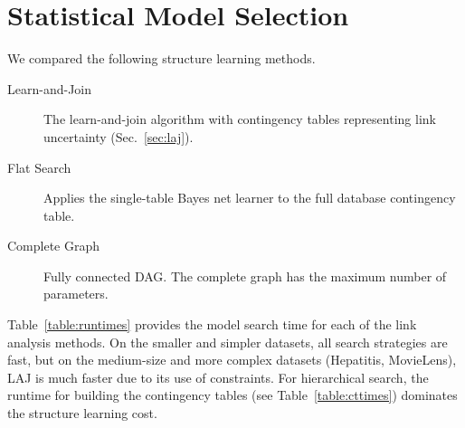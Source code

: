 \documentclass{vldb}
\begin{document}
\section{Statistical Model Selection}


We compared the following structure learning methods.

\begin{description}
\item[Learn-and-Join ] The learn-and-join algorithm with contingency tables representing link uncertainty (Sec.~\ref{sec:laj}).
\item[Flat Search]  Applies the single-table Bayes net learner to the full database contingency table.
\item[Complete Graph] Fully connected DAG. The complete graph has the maximum number of parameters.
\end{description}


Table~\ref{table:runtimes}
 provides the model search time for each of the link analysis methods. 
On the smaller and simpler datasets, all search strategies are fast, 
but on the medium-size and more complex datasets (Hepatitis, MovieLens), 
LAJ is much faster due to its use of constraints. For hierarchical search, the runtime for building the contingency tables (see Table~\ref{table:cttimes}) dominates the structure learning cost.
\end{document}
